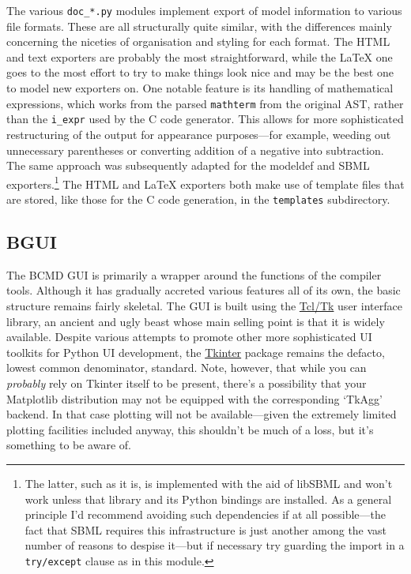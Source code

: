 \documentclass[a4paper,11pt]{article}
\begin{document}
The various \texttt{doc\_*.py} modules implement export of model information to various file formats. These are all structurally quite similar, with the differences mainly concerning the niceties of organisation and styling for each format. The HTML and text exporters are probably the most straightforward, while the \LaTeX{} one goes to the most effort to try to make things look nice and may be the best one to model new exporters on. One notable feature is its handling of mathematical expressions, which works from the parsed \texttt{mathterm} from the original AST, rather than the \texttt{i\_expr} used by the C code generator. This allows for more sophisticated restructuring of the output for appearance purposes---for example, weeding out unnecessary parentheses or converting addition of a negative into subtraction. The same approach was subsequently adapted for the modeldef and SBML exporters.\footnote{The latter, such as it is, is implemented with the aid of libSBML \citep{Bornstein:2008id} and won't work unless that library and its Python bindings are installed. As a general principle I'd recommend avoiding such dependencies if at all possible---the fact that SBML requires this infrastructure is just another among the vast number of reasons to despise it---but if necessary try guarding the import in a \texttt{try/except} clause as in this module.} The HTML and \LaTeX{} exporters both make use of template files that are stored, like those for the C code generation, in the \texttt{templates} subdirectory.

\subsection{BGUI}

The BCMD GUI is primarily a wrapper around the functions of the compiler tools. Although it has gradually accreted various features all of its own, the basic structure remains fairly skeletal. The GUI is built using the \href{http://www.tcl.tk}{Tcl/Tk} user interface library, an ancient and ugly beast whose main selling point is that it is widely available. Despite various attempts to promote other more sophisticated UI toolkits for Python UI development, the \href{https://wiki.python.org/moin/TkInter}{Tkinter} package remains the defacto, lowest common denominator, standard. Note, however, that while you can \textit{probably} rely on Tkinter itself to be present, there's a possibility that your Matplotlib distribution may not be equipped with the corresponding `TkAgg' backend. In that case plotting will not be available---given the extremely limited plotting facilities included anyway, this shouldn't be much of a loss, but it's something to be aware of.
\end{document}

